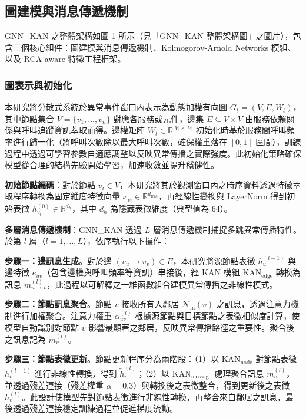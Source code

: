 \documentclass[10pt,a4paper,twocolumn]{article}
\begin{document}
\subsection{圖建模與消息傳遞機制}

GNN\_KAN 之整體架構如圖 1 所示（見「GNN\_KAN 整體架構圖」之圖片），包含三個核心組件：圖建模與消息傳遞機制、Kolmogorov-Arnold Networks 模組、以及 RCA-aware 特徵工程框架。

\subsubsection{圖表示與初始化}

本研究將分散式系統於異常事件窗口內表示為動態加權有向圖 $G_t = (V, E, W_t)$，其中節點集合 $V = \{v_1, ..., v_n\}$ 對應各服務或元件，邊集 $E \subseteq V \times V$ 由服務依賴關係與呼叫追蹤資訊萃取而得。邊權矩陣 $W_t \in \mathbb{R}^{|V| \times |V|}$ 初始化時基於服務間呼叫頻率進行歸一化（將呼叫次數除以最大呼叫次數，確保權重落在 $[0, 1]$ 區間），訓練過程中透過可學習參數自適應調整以反映異常傳播之實際強度。此初始化策略確保模型從合理的結構先驗開始學習，加速收斂並提升穩健性。

\textbf{初始節點編碼}：對於節點 $v_i \in V$，本研究將其於觀測窗口內之時序資料透過特徵萃取程序轉換為固定維度特徵向量 $\bar{x}_{v_i} \in \mathbb{R}^{d_{\text{feat}}}$，再經線性變換與 LayerNorm 得到初始表徵 $h_{v_i}^{(0)} \in \mathbb{R}^{d_h}$，其中 $d_h$ 為隱藏表徵維度（典型值為 64）。

\textbf{多層消息傳遞機制}：GNN\_KAN 透過 $L$ 層消息傳遞機制捕捉多跳異常傳播特性。於第 $l$ 層（$l = 1, ..., L$），依序執行以下操作：

\textbf{步驟一：邊訊息生成}。對於邊 $(v_u \to v_v) \in E$，本研究將源節點表徵 $h_u^{(l-1)}$ 與邊特徵 $e_{uv}$（包含邊權與呼叫頻率等資訊）串接後，經 KAN 模組 $\text{KAN}_{\text{edge}}$ 轉換為訊息 $m_{u \to v}^{(l)}$，此過程以可解釋之一維函數組合建模異常傳播之非線性模式。

\textbf{步驟二：節點訊息聚合}。節點 $v$ 接收所有入鄰居 $\mathcal{N}_{\text{in}}(v)$ 之訊息，透過注意力機制進行加權聚合。注意力權重 $\alpha_{uv}^{(l)}$ 根據源節點與目標節點之表徵相似度計算，使模型自動識別對節點 $v$ 影響最顯著之鄰居，反映異常傳播路徑之重要性。聚合後之訊息記為 $\tilde{m}_v^{(l)}$。

\textbf{步驟三：節點表徵更新}。節點更新程序分為兩階段：（1）以 $\text{KAN}_{\text{node}}$ 對節點表徵 $h_v^{(l-1)}$ 進行非線性轉換，得到 $\tilde{h}_v^{(l)}$；（2）以 $\text{KAN}_{\text{message}}$ 處理聚合訊息 $\tilde{m}_v^{(l)}$，並透過殘差連接（殘差權重 $\alpha=0.3$）與轉換後之表徵整合，得到更新後之表徵 $h_v^{(l)}$。此設計使模型先對節點表徵進行非線性轉換，再整合來自鄰居之訊息，最後透過殘差連接穩定訓練過程並促進梯度流動。
\end{document}
